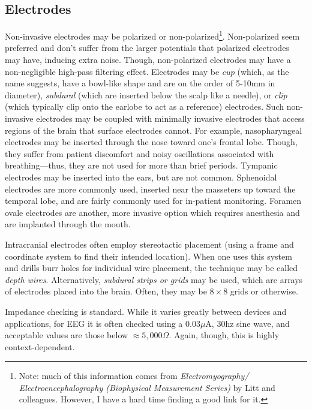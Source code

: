 \subsection{Electrodes}

Non-invasive electrodes may be polarized or non-polarized\footnote{Note: much of this information comes from \textit{Electromyography/ Electroencephalography (Biophysical Measurement Series)} by Litt and colleagues. However, I have a hard time finding a good link for it.}. Non-polarized seem preferred and don't suffer from the larger potentials that polarized electrodes may have, inducing extra noise. Though, non-polarized electrodes may have a non-negligible high-pass filtering effect. Electrodes may be \textit{cup} (which, as the name suggests, have a bowl-like shape and are on the order of 5-10mm in diameter), \textit{subdural} (which are inserted below the scalp like a needle), or \textit{clip} (which typically clip onto the earlobe to act as a reference) electrodes. Such non-invasive electrodes may be coupled with minimally invasive electrodes that access regions of the brain that surface electrodes cannot. For example, nasopharyngeal electrodes may be inserted through the nose toward one's frontal lobe. Though, they suffer from patient discomfort and noisy oscillations associated with breathing---thus, they are not used for more than brief periods. Tympanic electrodes may be inserted into the ears, but are not common. Sphenoidal electrodes are more commonly used, inserted near the masseters up toward the temporal lobe, and are fairly commonly used for in-patient monitoring. Foramen ovale electrodes are another, more invasive option which requires anesthesia and are implanted through the mouth. \newline

Intracranial electrodes often employ stereotactic placement (using a frame and coordinate system to find their intended location). When one uses this system and drills burr holes for individual wire placement, the technique may be called \textit{depth wires}. Alternatively, \textit{subdural strips or grids} may be used, which are arrays of electrodes placed into the brain. Often, they may be $8\times 8$ grids or otherwise.\newline

Impedance checking is standard. While it varies greatly between devices and applications, for EEG it is often checked using a $0.03\mu$A, 30hz sine wave, and acceptable values are those below $\approx 5,000\Omega$. Again, though, this is highly context-dependent. 


